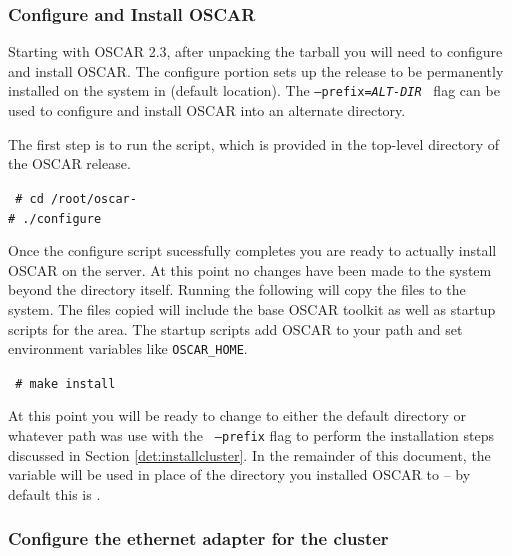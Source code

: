 
\subsubsection{Configure and Install OSCAR}
\label{det:configure-install}

Starting with OSCAR 2.3, after unpacking the tarball you will need to
configure and install OSCAR.  The configure portion sets up the release to
\begchange
be permanently installed on the system in  (default
\endchange
location).  The {\tt --prefix=\emph{ALT-DIR}} $\,$ flag can be used to
configure and install OSCAR into an alternate directory.  

The first step is to run the  script, which is provided in
the top-level directory of the OSCAR release.  

  \vspace{11pt} {\tt
          \# cd /root/oscar-\oscarversion \\
  \indent \# ./configure }  \vspace{11pt} 

Once the configure script sucessfully completes you are ready to actually
install OSCAR on the server.  At this point no changes have been made to
the system beyond the  directory itself.  Running
the following will copy the files to the system.  The files copied will
include the base OSCAR toolkit as well as startup scripts for the
 area.  The startup scripts add OSCAR to your path and set
environment variables like {\tt OSCAR\_HOME}.

  \vspace{11pt} {\tt
  \indent \# make install} \vspace{11pt}


At this point you will be ready to change to either the default
 directory or whatever path was use with the {\tt
--prefix} flag to perform the installation steps discussed in Section
\ref{det:installcluster}.
\begchange
  In the remainder of this document, the variable  will
be used in place of the directory you installed OSCAR to -- by default
this is .
\endchange



\subsubsection{Configure the ethernet adapter for the cluster} 
\label{det:serveradapter}

